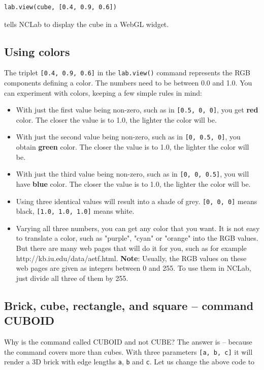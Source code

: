 \documentclass[article,A4,12pt]{llncs}
\begin{document}
\begin{verbatim}
lab.view(cube, [0.4, 0.9, 0.6])
\end{verbatim}
tells NCLab to display the cube in a WebGL widget. 

\subsection{Using colors}

The triplet {\tt [0.4, 0.9, 0.6]} in the {\tt lab.view()} command
represents the RGB components defining a color. The numbers need to be between 
0.0 and 1.0. You can experiment with colors, keeping a few simple rules in mind:

\begin{itemize}
\item With just the first value being non-zero, such as in {\tt [0.5, 0, 0]},
      you get {\bf red} color. The closer the value is to 1.0, the lighter the color
      will be.
\item With just the second value being non-zero, such as in {\tt [0, 0.5, 0]},
      you obtain {\bf green} color. The closer the  value is to 1.0, the lighter the color
      will be.
\item With just the third value being non-zero, such as in {\tt [0, 0, 0.5]},
      you will have {\bf blue} color. The closer the  value is to 1.0, the lighter the color
      will be.
\item Using three identical values will result into a shade of grey. {\tt [0, 0, 0]}
      means black, {\tt [1.0, 1.0, 1.0]} means white.
\item Varying all three numbers, you can get any color that you want. It is not 
      easy to translate a color, such as "purple", "cyan" or "orange" into the RGB
      values. But there are many web pages that will do it for you, such as for
      example http://kb.iu.edu/data/aetf.html. {\bf Note}: Usually,
      the RGB values on these web pages are given as integers between 0 and 255. To use them in NCLab,
      just divide all three of them by 255.
\end{itemize}

 
\subsection{Brick, cube, rectangle, and square -- command CUBOID}

Why is the command called 
CUBOID and not CUBE? The answer is -- because the command covers more 
than cubes. With three parameters {\tt [a, b, c]} it will render 
a 3D brick with edge lengths {\tt a}, {\tt b} and {\tt c}. Let us change the 
above code to  
\end{document}
